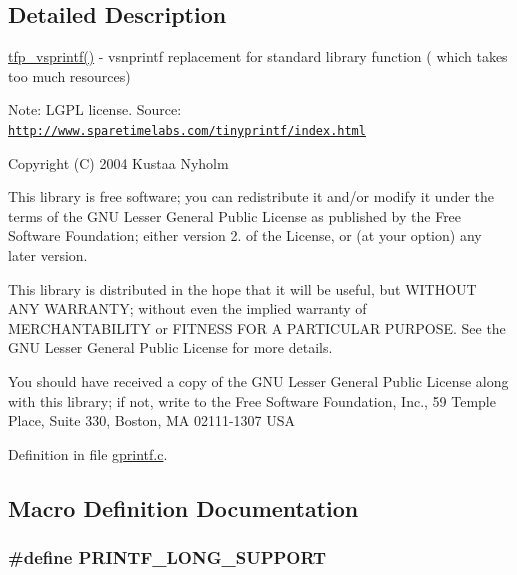 \subsection{Detailed Description}
\hyperlink{a00043_aa8dfc5ac91747032198002a008a6aa46}{tfp\+\_\+vsprintf()} -\/ vsnprintf replacement for standard library function ( which takes too much resources) 

Note\+: L\+G\+P\+L license. Source\+: \href{http://www.sparetimelabs.com/tinyprintf/index.html}{\tt http\+://www.\+sparetimelabs.\+com/tinyprintf/index.\+html}

Copyright (C) 2004 Kustaa Nyholm

This library is free software; you can redistribute it and/or modify it under the terms of the G\+N\+U Lesser General Public License as published by the Free Software Foundation; either version 2. of the License, or (at your option) any later version.

This library is distributed in the hope that it will be useful, but W\+I\+T\+H\+O\+U\+T A\+N\+Y W\+A\+R\+R\+A\+N\+T\+Y; without even the implied warranty of M\+E\+R\+C\+H\+A\+N\+T\+A\+B\+I\+L\+I\+T\+Y or F\+I\+T\+N\+E\+S\+S F\+O\+R A P\+A\+R\+T\+I\+C\+U\+L\+A\+R P\+U\+R\+P\+O\+S\+E. See the G\+N\+U Lesser General Public License for more details.

You should have received a copy of the G\+N\+U Lesser General Public License along with this library; if not, write to the Free Software Foundation, Inc., 59 Temple Place, Suite 330, Boston, M\+A 02111-\/1307 U\+S\+A 

Definition in file \hyperlink{a00043_source}{gprintf.\+c}.



\subsection{Macro Definition Documentation}
\hypertarget{a00043_ac346309c454e31a36e32039d9575ee3e}{
\subsubsection[{P\+R\+I\+N\+T\+F\+\_\+\+L\+O\+N\+G\+\_\+\+S\+U\+P\+P\+O\+R\+T}]{\setlength{\rightskip}{0pt plus 5cm}\#define P\+R\+I\+N\+T\+F\+\_\+\+L\+O\+N\+G\+\_\+\+S\+U\+P\+P\+O\+R\+T}}\label{a00043_ac346309c454e31a36e32039d9575ee3e}


